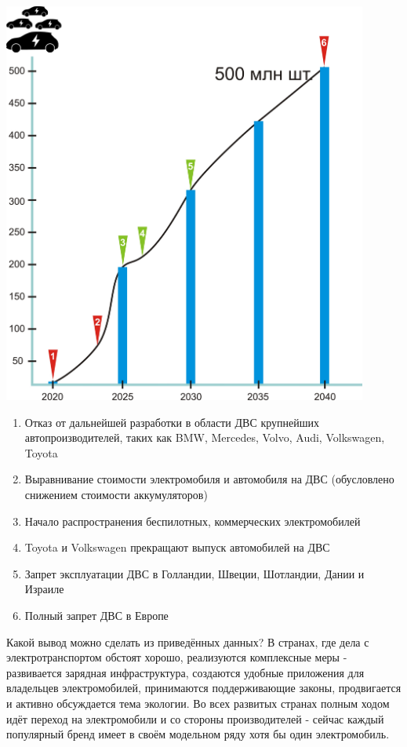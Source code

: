 \documentclass[a4paper,12pt]{report}
\begin{document}
\vspace*{1cm}
\includegraphics[width=12cm]{chart2}
\vspace*{1cm}

\begin{enumerate}
	\item Отказ от дальнейшей разработки в области ДВС крупнейших автопроизводителей, таких как BMW, Mercedes, Volvo, Audi, Volkswagen, Toyota
	\item Выравнивание стоимости электромобиля и автомобиля на ДВС (обусловлено снижением стоимости аккумуляторов)
	\item Начало распространения беспилотных, коммерческих электромобилей
	\item Toyota и Volkswagen прекращают выпуск автомобилей на ДВС
	\item Запрет эксплуатации ДВС в Голландии, Швеции, Шотландии, Дании и Израиле
	\item Полный запрет ДВС в Европе
\end{enumerate}


Какой вывод можно сделать из приведённых данных? В странах, где дела с электротранспортом обстоят хорошо, реализуются комплексные меры - развивается зарядная инфраструктура, создаются удобные приложения для владельцев электромобилей, принимаются поддерживающие законы, продвигается и активно обсуждается тема экологии. Во всех развитых странах полным ходом идёт переход на электромобили и со стороны производителей - сейчас каждый популярный бренд имеет в своём модельном ряду хотя бы один электромобиль.  
\end{document}
